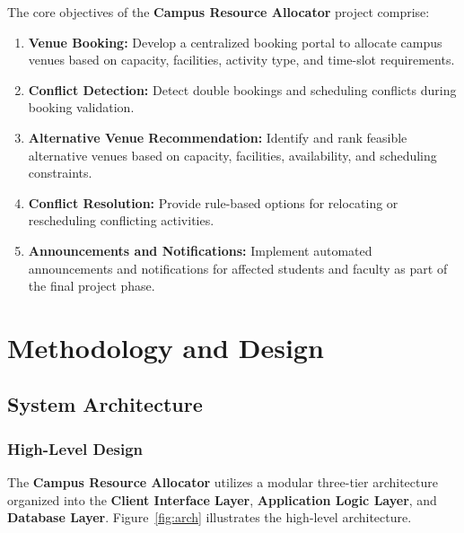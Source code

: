 \documentclass[12pt, a4paper, oneside]{report}
\begin{document}
The core objectives of the \textbf{Campus Resource Allocator} project comprise:
\begin{enumerate}
    \item \textbf{Venue Booking:} Develop a centralized booking portal to allocate campus venues based on capacity, facilities, activity type, and time-slot requirements.
    
    \item \textbf{Conflict Detection:} Detect double bookings and scheduling conflicts during booking validation.
    
    \item \textbf{Alternative Venue Recommendation:} Identify and rank feasible alternative venues based on capacity, facilities, availability, and scheduling constraints.
    
    \item \textbf{Conflict Resolution:} Provide rule-based options for relocating or rescheduling conflicting activities.
    
    \item \textbf{Announcements and Notifications:} Implement automated announcements and notifications for affected students and faculty as part of the final project phase.
\end{enumerate}
\chapter{Methodology and Design}

\section{System Architecture}
\subsection{High-Level Design}

The \textbf{Campus Resource Allocator} utilizes a modular three-tier architecture organized into the \textbf{Client Interface Layer}, \textbf{Application Logic Layer}, and \textbf{Database Layer}. Figure~\ref{fig:arch} illustrates the high-level architecture.
\end{document}
